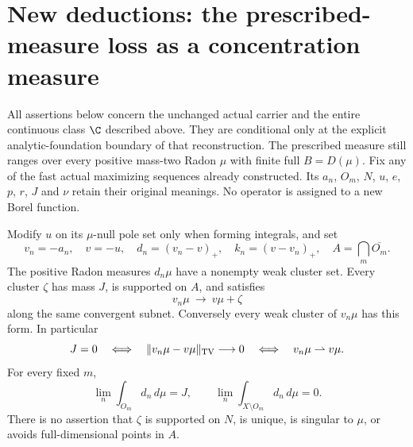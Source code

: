 \section{New deductions: the prescribed-measure loss as a concentration measure}
All assertions below concern the unchanged actual carrier and the entire
continuous class $\C$ described above. They are conditional only at the
explicit analytic-foundation boundary of that reconstruction. The prescribed
measure still ranges over every positive mass-two Radon $\mu$ with finite
full $B=D(\mu)$. Fix any of the fast actual maximizing sequences already
constructed. Its $a_n$, $O_m$, $N$, $u$, $e$, $p$, $r$, $J$ and $\nu$ retain
their original meanings. No operator is assigned to a new Borel function.

\begin{theorem}\label{fresh:concentration}
Modify $u$ on its $\mu$-null pole set only when forming integrals, and set
\[
 v_n=-a_n,\quad v=-u,\quad d_n=(v_n-v)_+,\quad k_n=(v-v_n)_+,
 \quad A=\bigcap_m\overline{O_m}.
\]
The positive Radon measures $d_n\mu$ have a nonempty weak cluster set.
Every cluster $\zeta$ has mass $J$, is supported on $A$, and satisfies
\[
 v_n\mu\ \longrightarrow\ v\mu+\zeta
\]
along the same convergent subnet. Conversely every weak cluster of
$v_n\mu$ has this form. In particular
\[
 J=0\quad\Longleftrightarrow\quad
 \|v_n\mu-v\mu\|_{\rm TV}\longrightarrow0
 \quad\Longleftrightarrow\quad v_n\mu\rightharpoonup v\mu.
\]
For every fixed $m$,
\[
 \lim_n\int_{O_m}d_n\,d\mu=J,
 \qquad \lim_n\int_{X\setminus O_m}d_n\,d\mu=0.
\]
There is no assertion that $\zeta$ is supported on $N$, is unique, is
singular to $\mu$, or avoids full-dimensional points in $A$.
\end{theorem}
